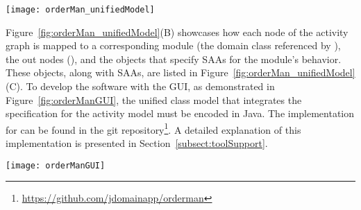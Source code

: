 \begin{figure*}[ht]
	\centering
	\texttt{[image: orderMan\_unifiedModel]}
	\caption{(A: Left) The activity graph whose nodes are labeled with activity and component classes; (B: Top-right) The  objects; (C: Bottom-right)  objects that are referenced by the .} %
	\label{fig:orderMan_unifiedModel}
	\vspace{-0.2cm}
\end{figure*}

Figure~\ref{fig:orderMan_unifiedModel}(B) showcases how each node of the activity graph is mapped to a corresponding module (\wrt the domain class referenced by ), the out nodes (\wrt {}), and the  objects that specify SAAs for the module's behavior. These  objects, along with SAAs, are listed in Figure~\ref{fig:orderMan_unifiedModel}(C). To develop the \orderman software with the GUI, as demonstrated in Figure~\ref{fig:orderManGUI}, the unified class model that integrates the \agl specification for the activity model must be encoded in Java. The implementation for \orderman can be found in the git repository\footnote{\url{https://github.com/jdomainapp/orderman}}. A detailed explanation of this implementation is presented in Section~\ref{subsect:toolSupport}.

\begin{figure*}[ht]
	\centering
	\texttt{[image: orderManGUI]}
	\caption{The GUI of the \orderman~software generated by the tool.} %
	\vspace{-0.3cm}
	\label{fig:orderManGUI}
\end{figure*}

